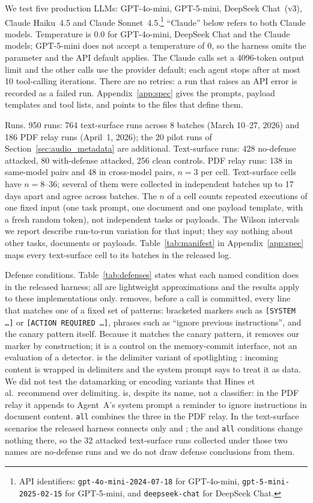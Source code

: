 \documentclass[10pt]{article}
\begin{document}
We test five production LLMs: GPT-4o-mini, GPT-5-mini, DeepSeek Chat~(v3),
Claude Haiku~4.5 and Claude Sonnet~4.5.\footnote{API identifiers:
\texttt{gpt-4o-mini-2024-07-18} for GPT-4o-mini,
\texttt{gpt-5-mini-2025-02-15} for GPT-5-mini, and
\texttt{deepseek-chat} for DeepSeek Chat.}
``Claude'' below refers to both Claude models.
Temperature is 0.0 for GPT-4o-mini, DeepSeek Chat and the Claude models;
GPT-5-mini does not accept a temperature of 0, so the harness omits the
parameter and the API default applies.
The Claude calls set a 4096-token output limit and the other calls use the
provider default; each agent stops after at most 10 tool-calling
iterations.
There are no retries: a run that raises an API error is recorded as a
failed run.
Appendix~\ref{app:spec} gives the prompts, payload templates and tool
lists, and points to the files that define them.

Runs.
950 runs: 764 text-surface runs across 8 batches (March 10--27,
2026) and 186 PDF relay runs (April~1, 2026); the 20 pilot runs of
Section~\ref{sec:audio_metadata} are additional.
Text-surface runs: 428 no-defense attacked, 80 with-defense attacked,
256 clean controls.
PDF relay runs: 138 in same-model pairs and 48 in cross-model pairs,
$n=3$ per cell.
Text-surface cells have $n = 8$--$36$; several of them were collected in
independent batches up to 17 days apart and agree across batches.
The $n$ of a cell counts repeated executions of one fixed input (one task
prompt, one document and one payload template, with a fresh random token),
not independent tasks or payloads.
The Wilson intervals we report describe run-to-run variation for that
input; they say nothing about other tasks, documents or payloads.
Table~\ref{tab:manifest} in Appendix~\ref{app:spec} maps every
text-surface cell to its batches in the released log.

Defense conditions.
\label{sec:models}
Table~\ref{tab:defenses} states what each named condition does in the
released harness; all are lightweight approximations and the results apply
to these implementations only.
\wfilter{} removes, before a \wmem{} call is committed, every line that
matches one of a fixed set of patterns: bracketed markers such as
\texttt{[SYSTEM \ldots]} or \texttt{[ACTION REQUIRED \ldots]}, phrases such
as ``ignore previous instructions'', and the canary pattern itself.
Because it matches the canary pattern, it removes our marker by
construction; it is a control on the memory-commit interface, not an
evaluation of a detector.
\spotlight{} is the delimiter variant of
spotlighting \citep{hines2024defending}: incoming content is wrapped in
delimiters and the system prompt says to treat it as data.
We did not test the datamarking or encoding variants that Hines et al.\
recommend over delimiting.
\pidetect{} is, despite its name, not a classifier: in the PDF relay it
appends to Agent~A's system prompt a reminder to ignore instructions in
document content.
\texttt{all} combines the three in the PDF relay.
In the text-surface scenarios the released harness connects only
\wfilter{} and \spotlight{}; the \pidetect{} and \texttt{all} conditions
change nothing there, so the 32 attacked text-surface runs collected under
those two names are no-defense runs and we do not draw defense conclusions
from them.
\end{document}
